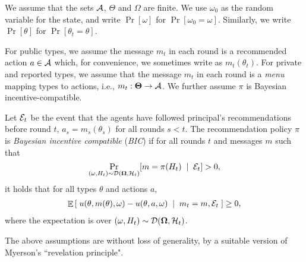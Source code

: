 We assume that the sets $\mathcal{A}$, $\varTheta$ and $\varOmega$ are finite. We use $\omega_0$ as the random variable for the state, and write $\Pr[\omega]$ for $\Pr[\omega_0=\omega]$. Similarly, we write $\Pr[\theta]$ for $\Pr[\theta_t=\theta]$.

For public types, we assume the message $m_t$ in each round is a recommended action $a \in \mathcal{A}$ which, for convenience, we sometimes write as $m_t(\theta_t)$. For private and reported types, we assume that the message $m_t$ in each round is a \emph{menu} mapping types to actions, i.e., $m_t:\bold{\Theta}\rightarrow\mathcal{A}$.
 We further assume $\pi$ is Bayesian incentive-compatible.
\begin{definition}
Let $\mathcal{E}_t$ be the event that the agents have followed principal's recommendations before round $t$, \ie $a_s = m_s(\theta_s)$ for all rounds $s<t$.
The recommendation policy $\pi$ is {\em Bayesian incentive compatible} (\emph{BIC}) if for all rounds $t$ and messages $m$ such that
\[ \Pr_{(\omega,H_t)\sim\mathcal{D}(\bold{\Omega},\mathcal{H}_t)}
    [m = \pi(H_t)\; \mid\; \mathcal{E}_{t}] > 0,
\]
it holds that for all types $\theta$ and actions $a$,
\begin{align}\label{eq:model-BIC}
\mathop{\mathbb{E}}\left[\; u(\theta,m(\theta),\omega) - u(\theta,a,\omega) \; \mid\; m_t=m, \mathcal{E}_{t}\;\right] \geq 0,
\end{align}
where the expectation is over $(\omega,H_t)\sim\mathcal{D}(\bold{\Omega},\mathcal{H}_t)$.
\end{definition}

\noindent The above assumptions are without loss of generality, by a suitable version of Myerson's ``revelation principle".

\iffalse
For reported types and private types, we assume that the message in each round is a \emph{menu} a mapping types to actions, and assume that the recommendation policy satisfies a similar but technically different BIC condition. Again, this is without loss of generality by revelation principle. to state the BIC condition, let $\pi^t$ be the menu recommended in round $t$. The recommendation policy $\pi$ is BIC if for each round $t$, type $\theta$, and any two menus $m,m'$ such that
    $\Pr[\pi^t= m|\EE_{t-1}] > 0$, we have
\begin{align}\label{eq:model-BIC-menus}
\E\left[\; u(\theta,m(\theta),\omega) - u(\theta,m'(\theta),\omega)
    \mid \pi^t = m, \EE_{t-1}\;\right] \geq 0.
\end{align}
(Again, the expectation is over the realized state $\omega$ and the randomness in the policy.)
\fi

